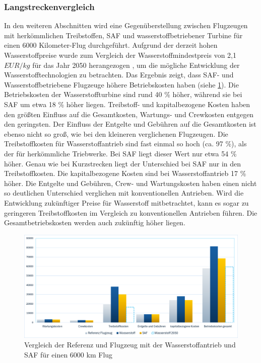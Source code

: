 \subsubsection{Langstreckenvergleich}
In den weiteren Abschnitten wird eine Gegenüberstellung zwischen Flugzeugen mit herkömmlichen Treibstoffen, 
SAF und wasserstoffbetriebener Turbine für einen 6000 Kilometer-Flug durchgeführt. %
Aufgrund der derzeit hohen Wasserstoffpreise wurde zum Vergleich der Wasserstoffmindestpreis 
von 2,1 $EUR/kg$ für das Jahr 2050 herangezogen \cite{hoelzen2022hydrogen}, 
um die mögliche Entwicklung der Wasserstofftechnologien zu betrachten.
%
Das Ergebnis zeigt, dass SAF- und Wasserstoffbetriebene Flugzeuge höhere Betriebskosten haben (siehe \ref{vergleichWA_Ref}).
Die Betriebskosten der Wasserstoffturbine sind rund 40 \% höher, während sie bei SAF um etwa 18 \% höher liegen.
Treibstoff- und kapitalbezogene Kosten haben den größten Einfluss auf die Gesamtkosten, 
Wartungs- und Crewkosten entgegen den geringsten.
Der Einfluss der Entgelte und Gebühren auf die Gesamtkosten ist ebenso nicht so groß, 
wie bei den kleineren verglichenen Flugzeugen.
Die Treibstoffkosten für Wasserstoffantrieb sind fast einmal so hoch (ca. 97 \%), als der für herkömmliche Triebwerke. 
Bei SAF liegt dieser Wert nur etwa 54 \% höher. 
Genau wie bei Kurzstrecken liegt der Unterschied bei SAF nur in den Treibstoffkosten.
Die kapitalbezogene Kosten sind bei Wasserstoffantrieb 17 \% höher.
Die Entgelte und Gebühren, Crew- und Wartungskosten haben einen nicht so 
deutlichen Unterschied verglichen mit konventionellen Antrieben. 
%
Wird die Entwicklung zukünftiger Preise für Wasserstoff mitbetrachtet, 
kann es sogar zu geringeren Treibstoffkosten im Vergleich zu konventionellen Antrieben führen. 
Die Gesamtbetriebskosten werden auch zukünftig höher liegen.

\begin{figure}[h]
	\centering
	\includegraphics[width=0.9\linewidth]{Bilder/VergleichWA_SAF.png}
	\caption[Betriebskosten]{Vergleich der Referenz und Flugzeug mit der Wasserstoffantrieb und SAF für einen 6000 km Flug}
	\label{vergleichWA_Ref}
\end{figure}

